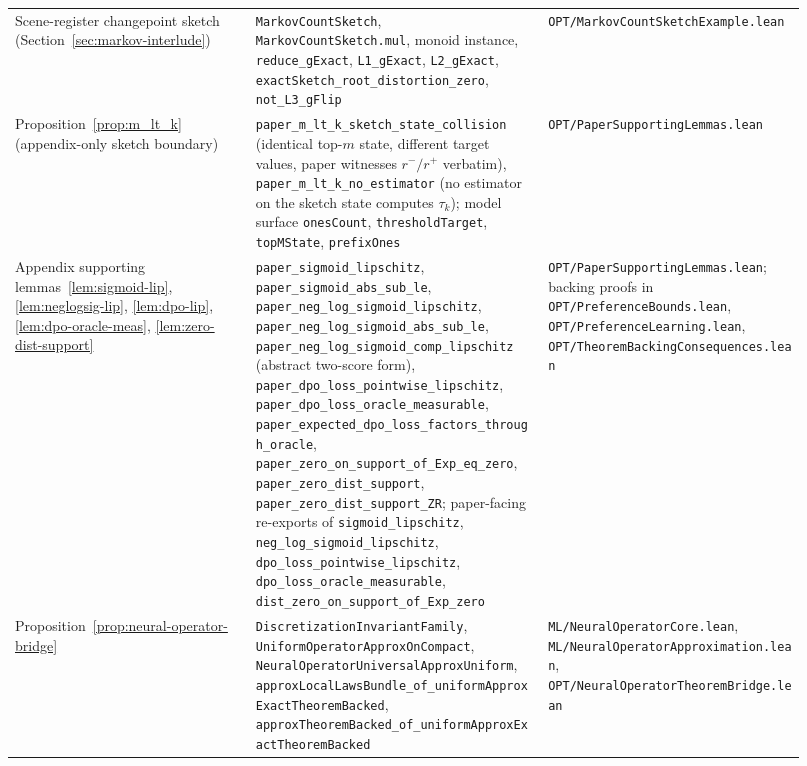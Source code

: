 {\begin{longtable}{p{0.28\linewidth}p{0.34\linewidth}p{0.30\linewidth}}
Scene-register changepoint sketch (Section~\ref{sec:markov-interlude}) &
\texttt{MarkovCountSketch}, \texttt{MarkovCountSketch.mul}, monoid instance,
\texttt{reduce\_gExact}, \texttt{L1\_gExact}, \texttt{L2\_gExact},
\texttt{exactSketch\_root\_distortion\_zero}, \texttt{not\_L3\_gFlip} &
\texttt{OPT/MarkovCountSketchExample.lean} \\

Proposition~\ref{prop:m_lt_k} (appendix-only sketch boundary) &
\texttt{paper\_m\_lt\_k\_sketch\_state\_collision} (identical top-$m$ state,
different target values, paper witnesses $r^{-}/r^{+}$ verbatim),
\texttt{paper\_m\_lt\_k\_no\_estimator} (no estimator on the sketch state
computes $\tau_k$); model surface \texttt{onesCount},
\texttt{thresholdTarget}, \texttt{topMState}, \texttt{prefixOnes} &
\texttt{OPT/PaperSupportingLemmas.lean} \\

Appendix supporting lemmas~\ref{lem:sigmoid-lip}, \ref{lem:neglogsig-lip},
\ref{lem:dpo-lip}, \ref{lem:dpo-oracle-meas}, \ref{lem:zero-dist-support} &
\texttt{paper\_sigmoid\_lipschitz}, \texttt{paper\_sigmoid\_abs\_sub\_le},
\texttt{paper\_neg\_log\_sigmoid\_lipschitz},
\texttt{paper\_neg\_log\_sigmoid\_abs\_sub\_le},
\texttt{paper\_neg\_log\_sigmoid\_comp\_lipschitz} (abstract two-score form),
\texttt{paper\_dpo\_loss\_pointwise\_lipschitz},
\texttt{paper\_dpo\_loss\_oracle\_measurable},
\nolinkurl{paper_expected_dpo_loss_factors_through_oracle},
\nolinkurl{paper_zero_on_support_of_Exp_eq_zero},
\texttt{paper\_zero\_dist\_support}, \texttt{paper\_zero\_dist\_support\_ZR};
paper-facing re-exports of \texttt{sigmoid\_lipschitz},
\texttt{neg\_log\_sigmoid\_lipschitz}, \texttt{dpo\_loss\_pointwise\_lipschitz},
\texttt{dpo\_loss\_oracle\_measurable},
\nolinkurl{dist_zero_on_support_of_Exp_zero} &
\texttt{OPT/PaperSupportingLemmas.lean}; backing proofs in
\texttt{OPT/PreferenceBounds.lean}, \texttt{OPT/PreferenceLearning.lean},
\texttt{OPT/TheoremBackingConsequences.lean} \\

Proposition~\ref{prop:neural-operator-bridge} &
\texttt{DiscretizationInvariantFamily}, \texttt{UniformOperatorApproxOnCompact}, \texttt{NeuralOperatorUniversalApproxUniform}, \texttt{approxLocalLawsBundle\_of\_uniformApproxExactTheoremBacked}, \texttt{approxTheoremBacked\_of\_uniformApproxExactTheoremBacked} &
\texttt{ML/NeuralOperatorCore.lean}, \texttt{ML/NeuralOperatorApproximation.lean}, \texttt{OPT/NeuralOperatorTheoremBridge.lean} \\


\end{longtable}}
